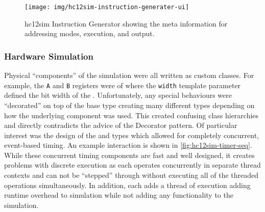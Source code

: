 \begin{figure}[h!t]
    \centering
    \texttt{[image: img/hc12sim-instruction-generater-ui]}
    \caption{hc12sim Instruction Generator showing the meta information for addressing modes, execution, and output.}
    \label{fig:hc12sim-instruction-generater-ui}
\end{figure}

\subsubsection*{Hardware Simulation}
\label{hc12sim:hardware-simulation}

Physical ``components'' of the simulation were all written as custom classes. For example, the \verb|A| and \verb|B| registers were of  where the \verb|width| template parameter defined the bit width of the . Unfortunately, any special behaviours were ``decorated'' on top of the base type creating many different types depending on how the underlying component was used. This created confusing class hierarchies and directly contradicts the advice of the Decorator pattern\cite[p.~175]{go4}. Of particular interest was the design of the  and  types which allowed for completely concurrent, event-based timing. An example interaction is shown in \cref{fig:hc12sim-timer-seq}. While these concurrent timing components are fast and well designed, it creates problems with discrete execution as each operates concurrently in separate thread contexts and can not be ``stepped'' through without executing all of the threaded operations simultaneously. In addition, each  adds a thread of execution adding runtime overhead to simulation while not adding any functionality to the simulation.

